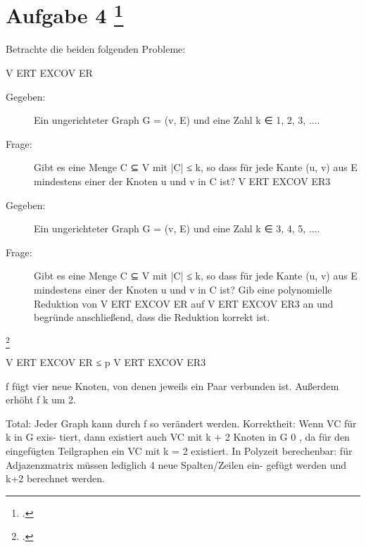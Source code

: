 \documentclass{lehramt-informatik-aufgabe}
\begin{document}
\section{Aufgabe 4
\footcite{46115:2016:09}}

Betrachte die beiden folgenden Probleme:

V ERT EXCOV ER

\begin{description}
\item[Gegeben:]

Ein ungerichteter Graph G = (v, E) und eine Zahl k ∈ {1, 2, 3, ...}.
\item[Frage:]

Gibt es eine Menge C ⊆ V mit |C| ≤ k, so dass für jede Kante (u, v) aus E
mindestens einer der Knoten u und v in C ist?
V ERT EXCOV ER3
\end{description}

\begin{description}
\item[Gegeben:]

Ein ungerichteter Graph G = (v, E) und eine Zahl k ∈ {3, 4, 5, ...}.

\item[Frage:]

Gibt es eine Menge C ⊆ V mit |C| ≤ k, so dass für jede Kante (u, v) aus E
mindestens einer der Knoten u und v in C ist?
Gib eine polynomielle Reduktion von V ERT EXCOV ER auf V ERT EXCOV ER3 an
und begründe anschließend, dass die Reduktion korrekt ist.
\end{description}
\footcite[Aufgabe 13, Seite 12]{theo:ab:4}

\begin{liAntwort}

V ERT EXCOV ER ≤ p V ERT EXCOV ER3

f fügt vier neue Knoten, von denen jeweils ein Paar verbunden ist. Außerdem erhöht f k um 2.

Total: Jeder Graph kann durch f so verändert werden. Korrektheit: Wenn VC für k in G exis-
tiert, dann existiert auch VC mit k + 2 Knoten in G 0 , da für den eingefügten Teilgraphen ein VC
mit k = 2 existiert.
In Polyzeit berechenbar: für Adjazenzmatrix müssen lediglich 4 neue Spalten/Zeilen ein-
gefügt werden und k+2 berechnet werden.

\end{liAntwort}
\end{document}
